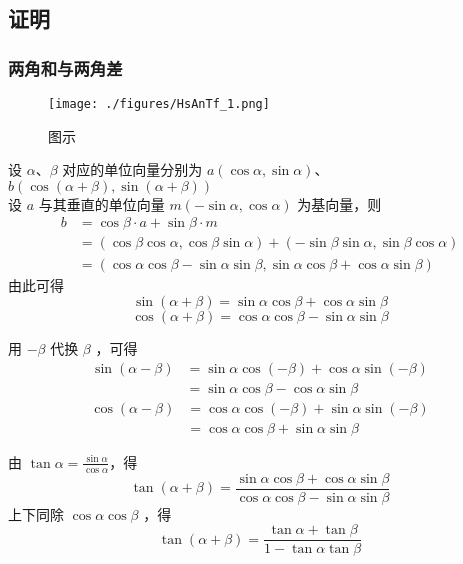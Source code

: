 \subsection{证明}
\subsubsection{两角和与两角差}
\begin{figure}[ht]
\centering
\texttt{[image: ./figures/HsAnTf\_1.png]}
\caption{图示} \label{HsAnTf_fig1}
\end{figure}
设 $\alpha$、$\beta$ 对应的单位向量分别为 $a(\cos\alpha,\sin\alpha)$、$b(\cos(\alpha+\beta),\sin(\alpha+\beta))$\\
设 $a$ 与其垂直的单位向量 $m(-\sin\alpha,\cos\alpha)$ 为基向量，则
\begin{equation}
\begin{aligned}
b &= \cos\beta \cdot a + \sin\beta \cdot m \\
&= (\cos\beta \cos\alpha,\cos\beta \sin\alpha) + (-\sin\beta \sin\alpha,\sin\beta \cos\alpha) \\
&= (\cos\alpha \cos\beta-\sin\alpha \sin\beta,\sin\alpha \cos\beta + \cos\alpha \sin\beta)
\end{aligned}
\end{equation}
由此可得
\begin{equation}
\sin(\alpha+\beta) = \sin\alpha \cos\beta + \cos\alpha \sin\beta
\end{equation}
\begin{equation}
\cos(\alpha+\beta) = \cos\alpha \cos\beta - \sin\alpha \sin\beta
\end{equation}

用 $-\beta$ 代换 $\beta$ ，可得
\begin{equation}
\begin{aligned}
\sin(\alpha-\beta) &= \sin\alpha \cos(-\beta) + \cos\alpha \sin(-\beta)\\
&=\sin\alpha \cos\beta - \cos\alpha \sin\beta
\end{aligned}
\end{equation}
\begin{equation}
\begin{aligned}
\cos(\alpha-\beta) &= \cos\alpha \cos(-\beta) + \sin\alpha \sin(-\beta)\\
&=\cos\alpha \cos\beta + \sin\alpha \sin\beta
\end{aligned}
\end{equation}

由 $\tan\alpha = \frac{\sin\alpha}{\cos\alpha}$，得
\begin{equation}
\tan(\alpha+\beta) = \frac{\sin\alpha \cos\beta + \cos\alpha \sin\beta}{\cos\alpha \cos\beta - \sin\alpha \sin\beta}
\end{equation}
上下同除 $\cos\alpha\cos\beta$ ，得
\begin{equation}
\tan(\alpha+\beta) = \frac{\tan\alpha+\tan\beta}{1 - \tan\alpha\tan\beta}
\end{equation}

